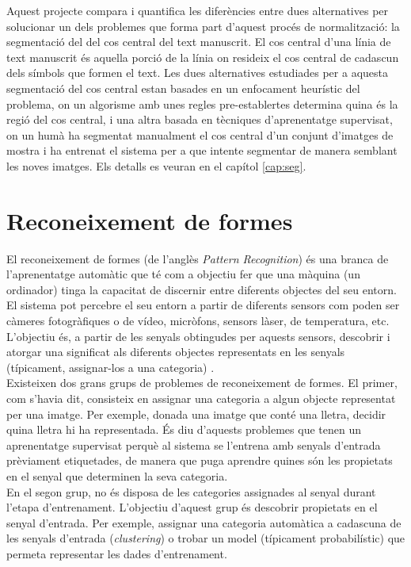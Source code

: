 Aquest projecte compara i quantifica les diferències entre dues alternatives per solucionar un dels problemes que forma part d'aquest procés de normalització: la segmentació del del cos central del text manuscrit. El cos central d'una línia de text manuscrit és aquella porció de la línia on resideix el cos central de cadascun dels símbols que formen el text. Les dues alternatives estudiades per a aquesta segmentació del cos central estan basades en un enfocament heurístic del problema, on un algorisme amb unes regles pre-establertes determina quina és la regió del cos central, i una altra basada en tècniques d'aprenentatge supervisat, on un humà ha segmentat manualment el cos central d'un conjunt d'imatges de mostra i ha entrenat el sistema per a que intente segmentar de manera semblant les noves imatges. Els detalls es veuran en el capítol \ref{cap:seg}.


\section{Reconeixement de formes}
El reconeixement de formes (de l'anglès \emph{Pattern Recognition}) és una branca de l'aprenentatge automàtic que té com a objectiu fer que una màquina (un ordinador) tinga la capacitat de discernir entre diferents objectes del seu entorn. El sistema pot percebre el seu entorn a partir de diferents sensors com poden ser càmeres fotogràfiques o de vídeo, micròfons, sensors làser, de temperatura, etc. L'objectiu és, a partir de les senyals obtingudes per aquests sensors, descobrir i atorgar una significat als diferents objectes representats en les senyals (típicament, assignar-los a una categoria) \cite{DH73}.\\

Existeixen dos grans grups de problemes de reconeixement de formes. El primer, com s'havia dit, consisteix en assignar una categoria a algun objecte representat per una imatge. Per exemple, donada una imatge que conté una lletra, decidir quina lletra hi ha representada. És diu d'aquests problemes que tenen un aprenentatge supervisat perquè al sistema se l'entrena amb senyals d'entrada prèviament etiquetades, de manera que puga aprendre quines són les propietats en el senyal que determinen la seva categoria.\\

En el segon grup, no és disposa de les categories assignades al senyal durant l'etapa d'entrenament. L'objectiu d'aquest grup és descobrir propietats en el senyal d'entrada. Per exemple, assignar una categoria automàtica a cadascuna de les senyals d'entrada (\emph{clustering}) o trobar un model (típicament probabilístic) que permeta representar les dades d'entrenament. \\

